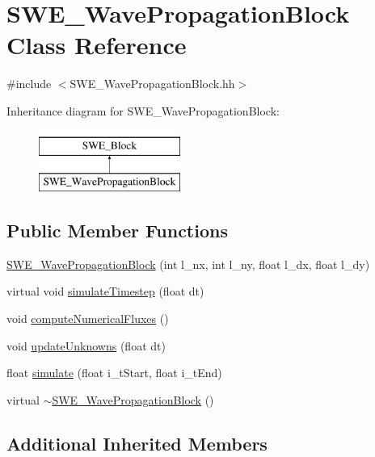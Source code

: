 \hypertarget{classSWE__WavePropagationBlock}{\section{S\-W\-E\-\_\-\-Wave\-Propagation\-Block Class Reference}
\label{classSWE__WavePropagationBlock}
}


{\ttfamily \#include $<$S\-W\-E\-\_\-\-Wave\-Propagation\-Block.\-hh$>$}

Inheritance diagram for S\-W\-E\-\_\-\-Wave\-Propagation\-Block\-:\begin{figure}[H]
\begin{center}
\leavevmode
\includegraphics[height=2.000000cm]{classSWE__WavePropagationBlock}
\end{center}
\end{figure}
\subsection*{Public Member Functions}
\begin{DoxyCompactItemize}
\item 
\hyperlink{classSWE__WavePropagationBlock_a9727e083d56a6d7aa9910f50c43080a9}{S\-W\-E\-\_\-\-Wave\-Propagation\-Block} (int l\-\_\-nx, int l\-\_\-ny, float l\-\_\-dx, float l\-\_\-dy)
\item 
virtual void \hyperlink{classSWE__WavePropagationBlock_a9a9aa7ad03fcb62420a7af0bf7b3e751}{simulate\-Timestep} (float dt)
\item 
void \hyperlink{classSWE__WavePropagationBlock_a5f6335a38fb3cf38623326959f06baf4}{compute\-Numerical\-Fluxes} ()
\item 
void \hyperlink{classSWE__WavePropagationBlock_a1b1422472a36602b34180e4ed27f6d8c}{update\-Unknowns} (float dt)
\item 
float \hyperlink{classSWE__WavePropagationBlock_ac4bcd2514a783638e7abd4bebfc271ea}{simulate} (float i\-\_\-t\-Start, float i\-\_\-t\-End)
\item 
virtual \hyperlink{classSWE__WavePropagationBlock_a9e53f3eaa7aee547ef88233069ff0667}{$\sim$\-S\-W\-E\-\_\-\-Wave\-Propagation\-Block} ()
\end{DoxyCompactItemize}
\subsection*{Additional Inherited Members}


